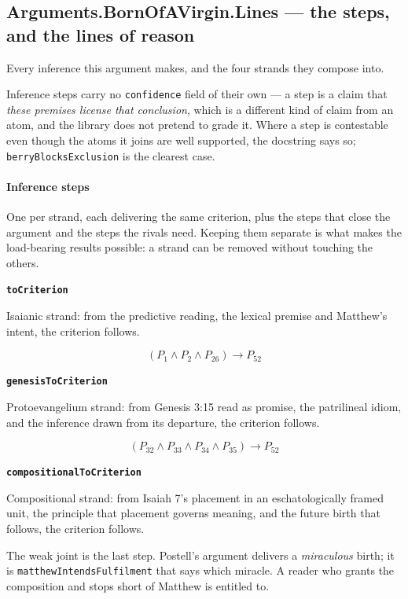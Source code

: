 \documentclass[11pt]{article}
\begin{document}
\subsection*{Arguments.BornOfAVirgin.Lines — the steps, and the lines of reason}
Every inference this argument makes, and the four strands they compose into.

Inference steps carry no \texttt{confidence} field of their own — a step is a claim that \emph{these premises license that conclusion}, which is a different kind of claim from an atom, and the library does not pretend to grade it. Where a step is contestable even though the atoms it joins are well supported, the docstring says so; \texttt{berry\allowbreak{}Blocks\allowbreak{}Exclusion} is the clearest case.

\paragraph*{Inference steps}
\leavevmode\par
One per strand, each delivering the same criterion, plus the steps that close the argument and the steps the rivals need. Keeping them separate is what makes the load-bearing results possible: a strand can be removed without touching the others.

\par\medskip\noindent\textbf{\texttt{to\allowbreak{}Criterion}}\par\nobreak\noindent
Isaianic strand: from the predictive reading, the lexical premise and Matthew's intent, the criterion follows.

\[(P_{1} \land P_{2} \land P_{26}) \rightarrow P_{52}\]
\par\medskip\noindent\textbf{\texttt{genesis\allowbreak{}To\allowbreak{}Criterion}}\par\nobreak\noindent
Protoevangelium strand: from Genesis 3:15 read as promise, the patrilineal idiom, and the inference drawn from its departure, the criterion follows.

\[(P_{32} \land P_{33} \land P_{34} \land P_{35}) \rightarrow P_{52}\]
\par\medskip\noindent\textbf{\texttt{compositional\allowbreak{}To\allowbreak{}Criterion}}\par\nobreak\noindent
Compositional strand: from Isaiah 7's placement in an eschatologically framed unit, the principle that placement governs meaning, and the future birth that follows, the criterion follows.

The weak joint is the last step. Postell's argument delivers a \emph{miraculous} birth; it is \texttt{matthew\allowbreak{}Intends\allowbreak{}Fulfilment} that says which miracle. A reader who grants the composition and stops short of Matthew is entitled to.
\end{document}
